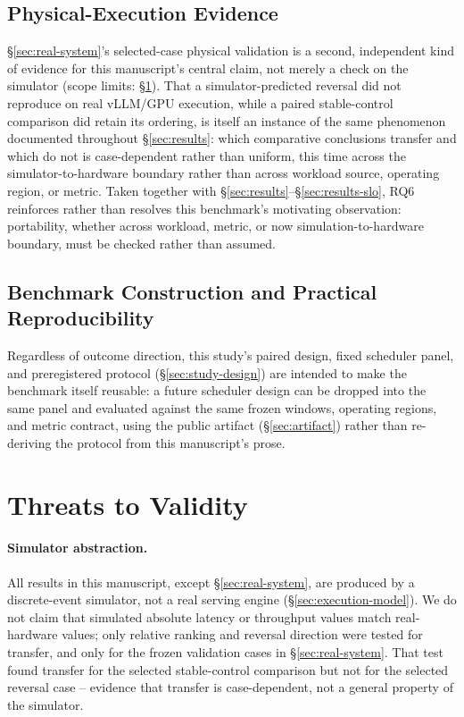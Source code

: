 \documentclass[sn-basic,Numbered,pdflatex]{sn-jnl}
\begin{document}
\subsection{Physical-Execution Evidence}

\S\ref{sec:real-system}'s selected-case physical validation is a
second, independent kind of evidence for this manuscript's central claim,
not merely a check on the simulator (scope limits: \S\ref{sec:threats}).
That a simulator-predicted reversal did not reproduce on real vLLM/GPU
execution, while a paired stable-control comparison did retain its
ordering, is itself an instance of the same phenomenon documented
throughout \S\ref{sec:results}: which comparative conclusions transfer
and which do not is case-dependent rather than uniform, this time across
the simulator-to-hardware boundary rather than across workload source,
operating region, or metric. Taken together with
\S\ref{sec:results}--\S\ref{sec:results-slo}, RQ6 reinforces rather than
resolves this benchmark's motivating observation: portability, whether
across workload, metric, or now simulation-to-hardware boundary, must be
checked rather than assumed.

\subsection{Benchmark Construction and Practical Reproducibility}

Regardless of outcome direction, this study's paired design, fixed
scheduler panel, and preregistered protocol (\S\ref{sec:study-design})
are intended to make the benchmark itself reusable: a future scheduler
design can be dropped into the same panel and evaluated against the same
frozen windows, operating regions, and metric contract, using the public
artifact (\S\ref{sec:artifact}) rather than re-deriving the protocol
from this manuscript's prose.

\section{Threats to Validity}
\label{sec:threats}

\paragraph{Simulator abstraction.} All results in this manuscript, except
\S\ref{sec:real-system}, are produced by a discrete-event simulator, not a
real serving engine (\S\ref{sec:execution-model}). We do not claim that
simulated absolute latency or throughput values match real-hardware
values; only relative ranking and reversal direction were tested for
transfer, and only for the frozen validation cases in
\S\ref{sec:real-system}. That test found transfer for the selected
stable-control comparison but not for the selected reversal case --
evidence that transfer is case-dependent, not a general property of the
simulator.
\end{document}
